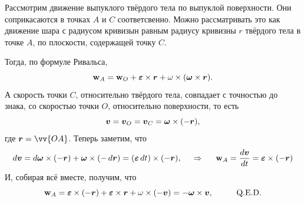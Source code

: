 \begin{figure}
  \begin{center}
      \vspace{-50mm}
  \end{center}
\end{figure}

Рассмотрим движение выпуклого твёрдого тела по выпуклой поверхности. Они соприкасаются в точках $A$ и $C$ соответсвенно. Можно рассматривать это как движение шара с радиусом кривизын равным радиусу кривизны $r$ твёрдого тела в точке $A$, по плоскости, содержащей точку $C$. 

Тогда, по формуле Ривальса,
$$
    \mbox{\boldmath $\mathrm{w}$}_A = \mbox{\boldmath $\mathrm{w}$}_O + \mbox{\boldmath $\varepsilon$} \times \mbox{\boldmath $r$} + \omega \times (\mbox{\boldmath $\omega$} \times \mbox{\boldmath $r$}).
$$
А скорость точки $C$, относительно твёрдого тела, совпадает с точностью до знака, со скоростью точки $O$, относительно поверхности, то есть 
$$
    \mbox{\boldmath $v$}= \mbox{\boldmath $v$}_O = \mbox{\boldmath $v$}_C = \mbox{\boldmath $\omega$} \times (-\mbox{\boldmath $r$}),
$$
где $\vc{r} = \vv{OA}$. Теперь заметим, что
$$
    d \mbox{\boldmath $v$} = d \mbox{\boldmath $\omega$} \times (-\mbox{\boldmath $r$}) + \mbox{\boldmath $\omega$} \times (- \, d \mbox{\boldmath $r$})
     = (\mbox{\boldmath $\varepsilon$} \, d t) \times (-\mbox{\boldmath $r$}),
     \hspace{0.5cm} \Rightarrow \hspace{0.5cm} 
     \mbox{\boldmath $\mathrm{w}$}_A = \frac{d \mbox{\boldmath $v$}}{d t}  = \mbox{\boldmath $\varepsilon$} \times (-\mbox{\boldmath $r$})
$$
И, собирая всё вместе, получим, что
$$
    \mbox{\boldmath $\mathrm{w}$}_A = \mbox{\boldmath $\varepsilon$} \times (-\mbox{\boldmath $r$}) + \mbox{\boldmath $\varepsilon$} \times \mbox{\boldmath $r$} + \omega \times (-\mbox{\boldmath $v$}) = - \mbox{\boldmath $\omega$} \times \mbox{\boldmath $v$},
    \hspace{1cm} 
    \text{Q.E.D.}
$$


